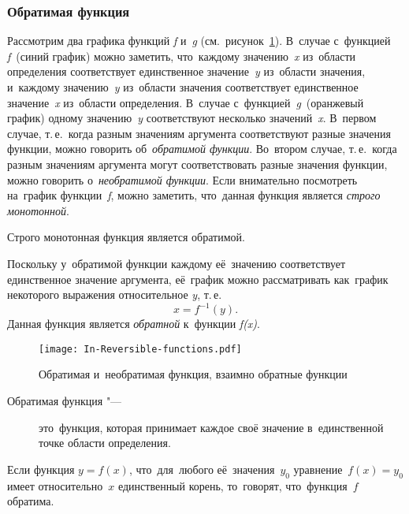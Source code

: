 \documentclass[]{scrartcl}
\begin{document}
\subsubsection{Обратимая функция}
Рассмотрим два графика функций \textit{f} и~\textit{g} (см.~рисунок~\ref{fig:In-Reversible-functions}). В~случае с~функцией \textit{f}~(синий график) можно заметить, что~каждому значению~\textit{x} из~области определения соответствует единственное значение~\textit{y} из~области значения, и~каждому значению~\textit{y} из~области значения соответствует единственное значение~\textit{x} из~области определения. В~случае с~функцией~\textit{g}~(оранжевый график)  одному значению~\textit{y} соответствуют несколько значений~\textit{x}. В~первом случае, т.\,е.~когда разным значениям аргумента соответствуют разные значения функции, можно говорить об~\emph{обратимой функции}. Во~втором случае, т.\,е.~когда разным значениям аргумента могут соответствовать разные значения функции, можно говорить о~\emph{необратимой функции}. Если внимательно посмотреть на~график функции~\textit{f}, можно заметить, что~данная функция является \emph{строго монотонной}.
\begin{proposition}
	Строго монотонная функция является обратимой.
\end{proposition}
Поскольку у~обратимой функции каждому её~значению соответствует единственное значение аргумента, её~график можно рассматривать как~график некоторого выражения относительное \textit{y}, т.\,е.
\begin{equation}\label{eq:reversible-function}
x=f^{-1}(y).
\end{equation}
Данная функция является \emph{обратной} к~функции \textit{f(x)}.

\begin{figure}[ht]
	\centering %
	\texttt{[image: In-Reversible-functions.pdf]}
	\caption{Обратимая и~необратимая функция, взаимно обратные функции}\label{fig:In-Reversible-functions}
\end{figure}

\begin{description}
	\item[Обратимая функция "---] это~функция, которая принимает каждое своё значение в~единственной точке области определения.
\end{description}
Если функция ${\displaystyle y=f(x)}$, что~для~любого её~значения~${\displaystyle y_{0}}$ уравнение~${\displaystyle f(x)=y_{0}}$ имеет относительно~${\displaystyle x}$ единственный корень, то~говорят, что~функция~${\displaystyle f}$ обратима.
\end{document}
